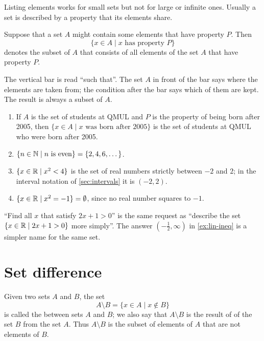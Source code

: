 Listing elements works for small sets but not for large or infinite ones. Usually a set is described by
a property that its elements share.

\begin{definition}
Suppose that a set $A$ might contain some elements that have property $P$. Then
\[
\{x\in A\mid x\text{ has property }P\}
\]
denotes the subset of $A$ that consists of all elements of the set $A$ that have property $P$.
\end{definition}

The vertical bar is read ``such that''. The set $A$ in front of the bar says where the elements are taken
from; the condition after the bar says which of them are kept. The result is always a subset of $A$.

\begin{example}
\begin{enumerate}
  \item If $A$ is the set of students at QMUL and $P$ is the property of being born after 2005, then
  $\{x\in A\mid x\text{ was born after 2005}\}$ is the set of students at QMUL who were born after 2005.
  \item $\{n\in\mathbb{N}\mid n\text{ is even}\}=\{2,4,6,\dots\}$.
  \item $\{x\in\mathbb{R}\mid x^2<4\}$ is the set of real numbers strictly between $-2$ and $2$; in the interval
  notation of \cref{sec:intervals} it is $(-2,2)$.
  \item $\{x\in\mathbb{R}\mid x^2=-1\}=\emptyset$, since no real number squares to $-1$.
\end{enumerate}
\end{example}

\begin{note}
``Find all $x$ that satisfy $2x+1>0$'' is the same request as ``describe the set
$\{x\in\mathbb{R}\mid 2x+1>0\}$ more simply''. The answer $(-\tfrac12,\infty)$ in \cref{ex:lin-ineq} is a
simpler name for the same set.
\end{note}

\section{Set difference}\label{sec:difference}

\begin{definition}
Given two sets $A$ and $B$, the set
\[
A\setminus B=\{x\in A\mid x\notin B\}
\]
is called the  between sets $A$ and $B$; we also say that $A\setminus B$ is the result of
 of the set $B$ from the set $A$. Thus $A\setminus B$ is the subset of elements of $A$
that are not elements of $B$. 
\end{definition}

